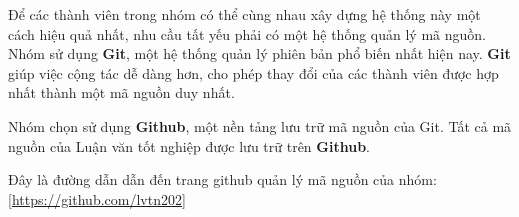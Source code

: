 Để các thành viên trong nhóm có thể cùng nhau xây dựng hệ thống này một cách hiệu quả nhất, nhu cầu tất yếu phải có một hệ thống quản lý mã nguồn. Nhóm sử dụng \textbf{Git}, một hệ thống quản lý phiên bản phổ biến nhất hiện nay. \textbf{Git} giúp việc cộng tác dễ dàng hơn, cho phép thay đổi của các thành viên được hợp nhất thành một mã nguồn duy nhất.\par

Nhóm chọn sử dụng \textbf{Github}, một nền tảng lưu trữ mã nguồn của Git. Tất cả mã nguồn của Luận văn tốt nghiệp được lưu trữ trên \textbf{Github}.

Đây là đường dẫn dẫn đến trang github quản lý mã nguồn của nhóm: \href{https://github.com/lvtn202}{[https://github.com/lvtn202]}